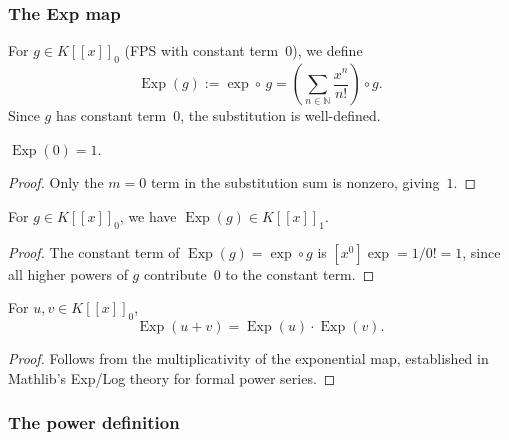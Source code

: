\subsubsection{The Exp map}

\begin{definition}
\label{def.fps.fpsExp}
\leanhelper
\leanok
For $g\in K[[x]]_0$ (FPS with constant term~$0$), we define
\[
\operatorname{Exp}(g) := \exp\circ\, g
= \left(\sum_{n\in\mathbb{N}} \frac{x^n}{n!}\right)\circ g.
\]
Since $g$ has constant term~$0$, the substitution is well-defined.
\end{definition}

\begin{lemma}
\label{lem.fps.fpsExp-zero}
\leanhelper
\leanok
$\operatorname{Exp}(0)=1$.
\end{lemma}

\begin{proof}
\leanok
Only the $m=0$ term in the substitution sum is nonzero, giving~$1$.
\end{proof}

\begin{lemma}
\label{lem.fps.hasConstantTermOne-fpsExp}
\leanhelper
\leanok
For $g\in K[[x]]_0$, we have $\operatorname{Exp}(g)\in K[[x]]_1$.
\end{lemma}

\begin{proof}
\leanok
The constant term of $\operatorname{Exp}(g) = \exp\circ g$ is $[x^0]\exp = 1/0! = 1$,
since all higher powers of $g$ contribute~$0$ to the constant term.
\end{proof}

\begin{theorem}
\label{thm.fps.fpsExp-add}
\leanhelper
\leanok
For $u,v\in K[[x]]_0$,
\[
\operatorname{Exp}(u+v) = \operatorname{Exp}(u)\cdot\operatorname{Exp}(v).
\]
\end{theorem}

\begin{proof}
\leanok
Follows from the multiplicativity of the exponential map, established
in Mathlib's Exp/Log theory for formal power series.
\end{proof}

\subsubsection{The power definition}

